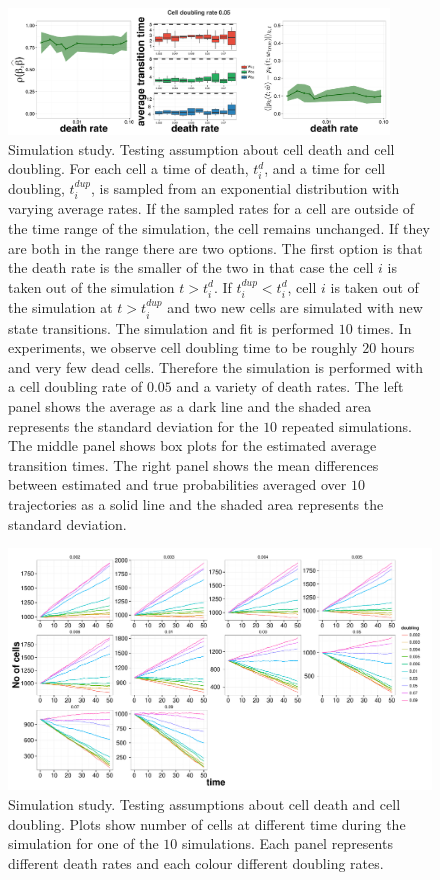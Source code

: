 \begin{figure}
  \centering
  \includegraphics[width=0.9\textwidth]{pics/realist-dupl.pdf}
  \caption{Simulation study. Testing assumption about cell death and cell doubling. For each cell a time of death, $t_i^{d}$, and a time for cell doubling, $t_i^{dup}$, is sampled from an exponential distribution with varying average rates. If the sampled rates for a cell are outside of the time range of the simulation, the cell remains unchanged. If they are both in the range there are two options. The first option is that the death rate is the smaller of the two in that case the cell $i$ is taken out of the simulation $t>t_i^d$. If $t_i^{dup}<t_i^d$, cell $i$ is taken out of the simulation at $t > t_i^{dup}$ and two new cells are simulated with new state transitions. The simulation and fit is performed $10$ times. In experiments, we observe cell doubling time to be roughly $20$ hours and very few dead cells. Therefore the simulation is performed with a cell doubling rate of $0.05$ and a variety of death rates. The left panel shows the average as a dark line and the shaded area represents the standard deviation for the $10$ repeated simulations. The middle panel shows box plots for the estimated average transition times. The right panel shows the mean differences between estimated and true probabilities averaged over $10$ trajectories as a solid line and the shaded area represents the standard deviation.}
  \label{fig:dupl-realistic}
\end{figure}

\begin{figure}
    \centering \includegraphics[width=1\textwidth]{pics/n-cell.pdf}
    \caption{Simulation study. Testing assumptions about cell death and cell doubling. Plots show number of cells at different time during the simulation for one of the $10$ simulations. Each panel represents different death rates and each colour different doubling rates.}
\label{fig:no-cells-dupl}
\end{figure}

